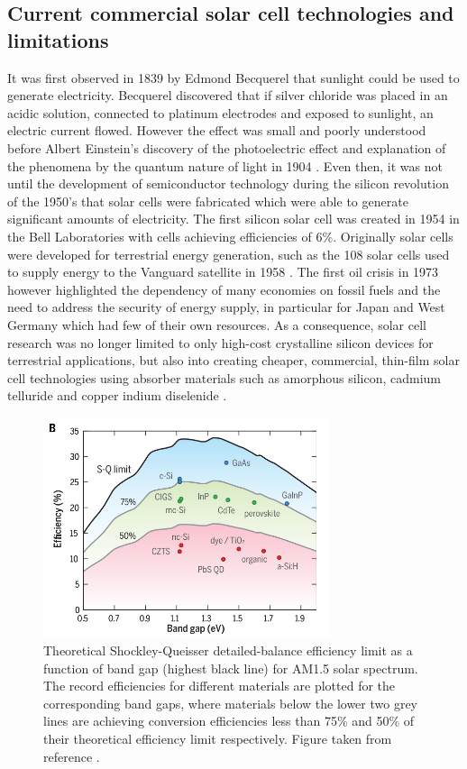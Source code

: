 \documentclass[11pt, twoside]{report}
\begin{document}
\subsection{Current commercial solar cell technologies and limitations}\label{current_tech}
It was first observed in 1839 by Edmond Becquerel that sunlight could be used to generate electricity. Becquerel discovered that if  silver chloride was placed in an acidic solution, connected to platinum electrodes and exposed to sunlight, an electric current flowed. However the effect was small and poorly understood before Albert Einstein's discovery of the photoelectric effect and explanation of the phenomena by the quantum nature of light in 1904 \cite{PV_history1}. Even then, it was not until the development of semiconductor technology during the silicon revolution of the 1950's that solar cells were fabricated which were able to generate significant amounts of electricity. The first silicon solar cell was created in 1954 in the Bell Laboratories with cells achieving efficiencies of 6\%. 
Originally solar cells were developed for terrestrial energy generation, such as the 108 solar cells used to supply energy to the Vanguard satellite in 1958 \cite{PV_history1}. The first oil crisis in 1973 however highlighted the dependency of many economies on fossil fuels and the need to address the security of energy supply,  in particular for Japan and West Germany which had few of their own resources. As a consequence, solar cell research was no longer limited to only high-cost crystalline silicon devices for terrestrial applications, but also into creating cheaper, commercial, thin-film solar cell technologies using absorber materials such as amorphous silicon, cadmium telluride and copper indium diselenide  \cite{PV_history2}.

\begin{figure}[h!]
  \centering
    \includegraphics[width=0.75\textwidth]{figures/SQ_new.png}
    \caption{Theoretical Shockley-Queisser detailed-balance efficiency limit \cite{SQ_1961} as a function of band gap (highest black line) for AM1.5 solar spectrum. The record efficiencies for different materials are plotted for the corresponding band gaps, where materials below the lower two grey lines are achieving conversion efficiencies less than 75\% and 50\% of their theoretical efficiency limit respectively. Figure taken from reference .}
  \label{SQ}
\end{figure}
\end{document}
